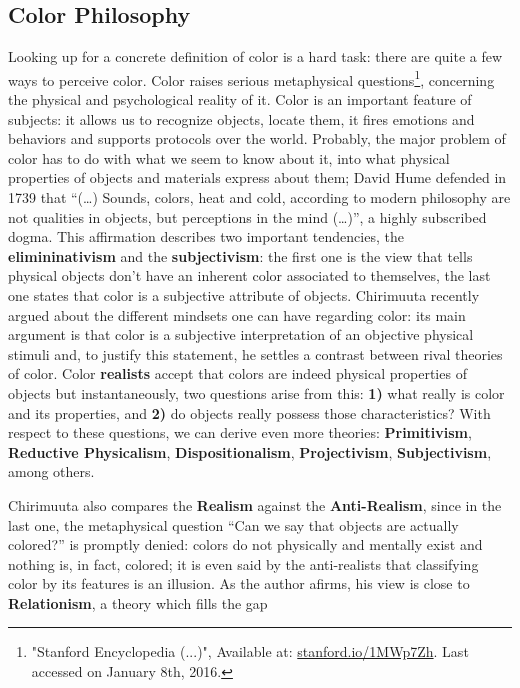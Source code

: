 \documentclass{report}
\begin{document}
\subsection{Color Philosophy}
\label{sec:colorphilosophy}
Looking up for a concrete definition of color is a hard task: there are quite a few ways to perceive color. Color
raises serious metaphysical questions\footnote{"Stanford Encyclopedia (...)", Available at: \url{stanford.io/1MWp7Zh}. Last accessed on January 8th, 2016.},
concerning the physical and psychological reality of it. Color is an
important feature of subjects: it allows us to recognize objects, locate them, it fires emotions and
behaviors and supports protocols over the world. Probably, the major problem of color has to do with what
we seem to know about it, into what physical properties of objects and materials express about them; David
Hume defended in 1739 \cite{Hume1739} that “(…) Sounds, colors, heat and cold, according to modern philosophy are not
qualities in objects, but perceptions in the mind (…)”, a highly subscribed dogma. This affirmation describes
two important tendencies, the \textbf{elimininativism} and the \textbf{subjectivism}: the first one is the
view that tells physical objects don’t have an inherent color associated to themselves, the last one states
that color is a subjective attribute of objects. Chirimuuta recently argued \cite{Chirimuuta2014} about the different
mindsets one can have regarding color: its main argument is that color is a subjective interpretation of
an objective physical stimuli and, to justify this statement, he settles a contrast between rival theories
of color. Color \textbf{realists} accept that colors are indeed physical properties of objects but instantaneously,
two questions arise from this: \textbf{1)} what really is color and its properties, and \textbf{2)} do objects really possess
those characteristics? With respect to these questions, we can derive even more theories: \textbf{Primitivism}, \textbf{Reductive Physicalism}, \textbf{Dispositionalism}, \textbf{Projectivism}, \textbf{Subjectivism}, among others. \par
%
Chirimuuta \cite{Chirimuuta2014} also compares the \textbf{Realism} against the \textbf{Anti-Realism}, since in the last one, the metaphysical question
“Can we say that objects are actually colored?” is promptly denied: colors do not physically and mentally
exist and nothing is, in fact, colored; it is even said by the anti-realists that classifying color by its features is an  illusion. As the author afirms, his view is close to \textbf{Relationism}, a theory which fills the gap
\end{document}
